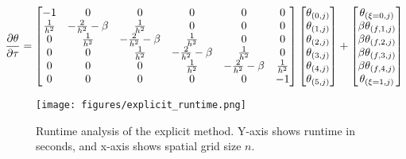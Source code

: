 \documentclass[10pt,letterpaper,notitlepage]{article}
\begin{document}
    \begin{adjustwidth}{-1cm}{-1cm}
        \begin{equation}
            \pdv{\theta}{\tau}
            =
            \begin{bmatrix}
                -1 & 0 & 0 & 0 & 0 & 0 \\
                \frac{1}{h^2} & -\frac{2}{h^2} - \beta & \frac{1}{h^2} & 0 & 0 & 0 \\
                0& \frac{1}{h^2} & -\frac{2}{h^2} - \beta & \frac{1}{h^2} & 0 & 0 \\
                0&0&\frac{1}{h^2} & -\frac{2}{h^2} - \beta & \frac{1}{h^2} & 0\\
                0&0&0&\frac{1}{h^2} & -\frac{2}{h^2} - \beta & \frac{1}{h^2} \\
                0 & 0 & 0 & 0 & 0 & -1 
            \end{bmatrix}
            \begin{bmatrix}
                \theta_{(0, j)} \\
                \theta_{(1, j)} \\
                \theta_{(2, j)} \\
                \theta_{(3, j)} \\
                \theta_{(4, j)} \\
                \theta_{(5, j)}
            \end{bmatrix}
            +
            \begin{bmatrix}
                \theta_{(\xi=0,j)} \\
                \beta \theta_{(f,1,j)} \\
                \beta \theta_{(f,2,j)} \\
                \beta \theta_{(f,3,j)} \\
                \beta \theta_{(f,4,j)} \\
                \theta_{(\xi=1,j)}
            \end{bmatrix}
            \label{eq:td_Axb}
        \end{equation}
    \end{adjustwidth}
    \begin{figure}
        \centering
        \texttt{[image: figures/explicit\_runtime.png]}
        \caption[Explicit method run-time analysis]{Runtime analysis of the explicit method. Y-axis shows runtime in seconds, and x-axis shows spatial grid size $n$.}
        \label{fig:explicit_runtime}
    \end{figure}
\end{document}
